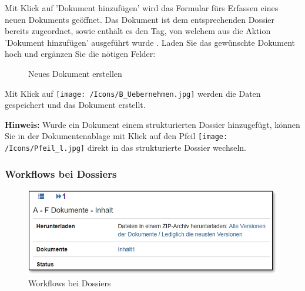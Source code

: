 Mit Klick auf 'Dokument hinzufügen' wird das Formular fürs Erfassen eines neuen Dokuments geöffnet. Das Dokument ist dem entsprechenden Dossier  bereits zugeordnet, sowie enthält es den Tag, von welchem aus die Aktion 'Dokument hinzufügen' ausgeführt wurde . Laden Sie das gewünschte Dokument hoch  und ergänzen Sie die nötigen Felder:

\begin{figure}[H]
  \vspace{-5pt}
\caption{Neues Dokument erstellen}
\end{figure}

Mit Klick auf \texttt{[image: /Icons/B\_Uebernehmen.jpg]} werden die Daten gespeichert und das Dokument erstellt.

\vspace{\baselineskip}

\textbf{Hinweis:} Wurde ein Dokument einem strukturierten Dossier hinzugefügt, können Sie in der Dokumentenablage mit Klick auf den Pfeil \texttt{[image: /Icons/Pfeil\_l.jpg]} direkt in das strukturierte Dossier wechseln.

\pagebreak
\subsubsection{Workflows bei Dossiers}

\begin{figure}
  \vspace{-30pt}
  \begin{center}
    \includegraphics[width=1\linewidth]{../chapters/11_Dokumentenablage/pictures/doss_Workflow.jpg}
  \end{center}
  \vspace{-20pt}
  \caption{Workflows bei Dossiers}
\end{figure}

